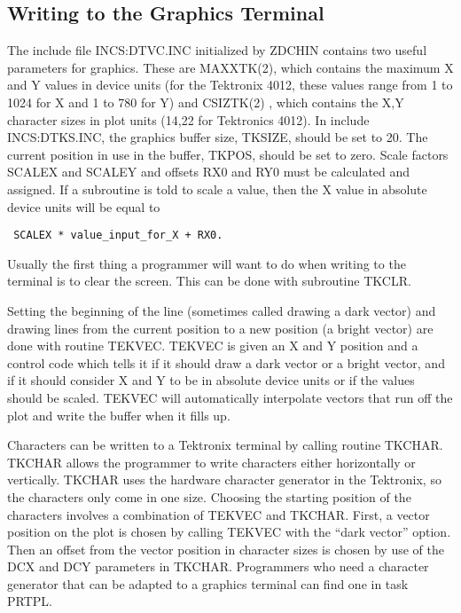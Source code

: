 \subsection{Writing to the Graphics Terminal}

The include file INCS:DTVC.INC initialized by ZDCHIN contains two
useful parameters for graphics.  These are MAXXTK(2), which contains
the maximum X and Y values in device units
(for the Tektronix 4012, these values range from 1 to 1024 for X and 1
to 780 for Y) and CSIZTK(2) , which contains the X,Y character
sizes in plot units (14,22 for Tektronics 4012). In include
INCS:DTKS.INC, the graphics buffer size,
TKSIZE, should be set to 20.  The current position in use in the
buffer, TKPOS, should be set to zero. Scale factors SCALEX and SCALEY
and offsets RX0 and RY0 must be calculated and assigned.  If a
subroutine is told to scale a value, then the X value in absolute
device units will be equal to
\begin{verbatim}
 SCALEX * value_input_for_X + RX0.
\end{verbatim}
Usually the first thing a programmer will want to do when writing to
the terminal is to clear the screen.  This can be done with subroutine
TKCLR.

Setting the beginning of the line (sometimes called drawing a dark
vector) and drawing lines from the current position to a new position
(a bright vector) are done with routine TEKVEC.  TEKVEC is given an X
and Y position and a control code which tells it if it should draw a
dark vector or a bright vector, and if it should consider X and Y to
be in absolute device units  or if the values should be scaled. TEKVEC
will automatically interpolate vectors that run off the plot and write
the buffer when it fills up.

Characters can be written to a Tektronix terminal by calling routine
TKCHAR.  TKCHAR allows the programmer to write characters either
horizontally or vertically.  TKCHAR uses the hardware character
generator in the Tektronix, so the characters only come in one size.
Choosing the starting position of the characters involves a
combination of TEKVEC and TKCHAR.  First, a vector position on the
plot is chosen by calling TEKVEC with the ``dark vector'' option.  Then
an offset from the vector position in character sizes is chosen by use
of the DCX and DCY parameters in TKCHAR. Programmers who need a
character generator that can be adapted to a graphics terminal can
find one in task PRTPL.

